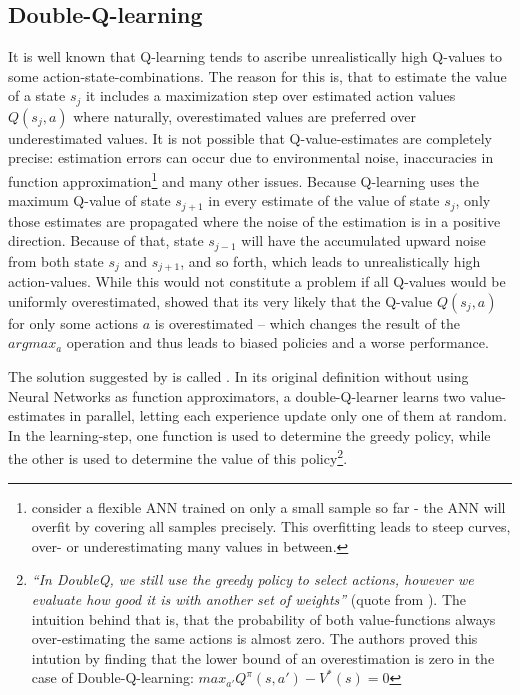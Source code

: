 \subsection{Double-Q-learning}
It is well known that Q-learning tends to ascribe unrealistically high Q-values to some action-state-combinations. The reason for this is, that to estimate the value of a state $s_j$ it includes a maximization step over estimated action values $Q(s_j,a)$ where naturally, overestimated values are preferred over underestimated values. 
It is not possible that Q-value-estimates are completely precise: estimation errors can occur due to environmental noise, inaccuracies in function approximation\footnote{consider a flexible ANN trained on only a small sample so far - the ANN will overfit by covering all samples precisely. This overfitting leads to steep curves, over- or underestimating many values in between.} and many other issues. Because Q-learning uses the maximum Q-value of state $s_{j+1}$ in every estimate of the value of state $s_j$, only those estimates are propagated where the noise of the estimation is in a positive direction. Because of that, state $s_{j-1}$ will have the accumulated upward noise from both state $s_j$ and $s_{j+1}$, and so forth, which leads to unrealistically high action-values. While this would not constitute a problem if all Q-values would be uniformly overestimated, \cite{van_hasselt_deep_2015} showed that its very likely that the Q-value $Q(s_j,a)$ for only some actions $a$ is overestimated -- which changes the result of the $argmax_a$ operation and thus leads to biased policies and a worse performance.

The solution suggested by \cite{van_hasselt_deep_2015} is called . In its original definition without using Neural Networks as function approximators, a double-Q-learner learns two value-estimates in parallel, letting each experience update only one of them at random. In the learning-step, one function is used to determine the greedy policy, while the other is used to determine the value of this policy\footnote{\textit{``In DoubleQ, we still use the greedy policy to select actions, however we evaluate how good it is with another set of weights''} (quote from \cite{van_hasselt_deep_2015}). The intuition behind that is, that the probability of both value-functions always over-estimating the same actions is almost zero. The authors proved this intution by finding that the lower bound of an overestimation is zero in the case of Double-Q-learning: $max_{a'}Q^\pi(s,a') - V^*(s) = 0$}.\\

